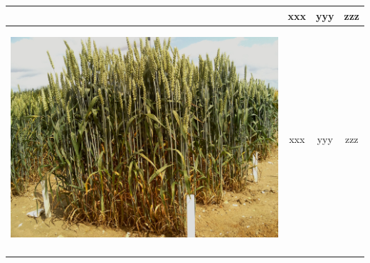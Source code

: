\begin{table}[hp!]
\begin{tabular}{ | c | c | c | c |}
\begin{minipage}{.3\textwidth}
\begin{center}
      \end{center}
    \end{minipage}
    &
      xxx
    & 
      yyy
    & 
      zzz
    \\ \hline
    \begin{minipage}{.3\textwidth}
      \begin{center}
		\includegraphics[width=\linewidth]{Images/003}
      \end{center}
    \end{minipage}
    &
      xxx
    & 
      yyy
    & 
      zzz
    \\ \hline
    \begin{minipage}{.3\textwidth}
      \begin{center}

\end{center}
\end{minipage}
\end{tabular}
\end{table}
